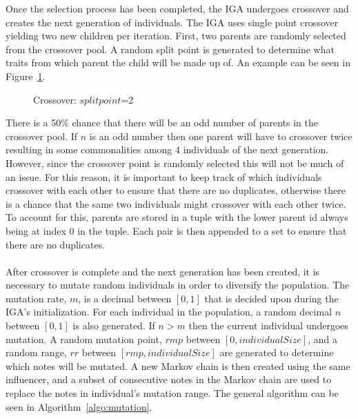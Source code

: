 \documentclass[12pt]{article} %
\begin{document}
Once the selection process has been completed, the IGA undergoes crossover and creates the next generation of individuals. The IGA uses single point crossover yielding two new children per iteration. First, two parents are randomly selected from the crossover pool. A random split point is generated to determine what traits from which parent the child will be made up of. An example can be seen in Figure~\ref{fig:crossover_ex}.

\begin{figure}[H]
\caption{Crossover: $split point$=2}
\label{fig:crossover_ex}
\end{figure}

There is a 50\% chance that there will be an odd number of parents in the crossover pool. If $n$ is an odd number then one parent will have to crossover twice resulting in some commonalities among 4 individuals of the next generation. However, since the crossover point is randomly selected this will not be much of an issue. For this reason, it is important to keep track of which individuals crossover with each other to ensure that there are no duplicates, otherwise there is a chance that the same two individuals might crossover with each other twice. To account for this, parents are stored in a tuple with the lower parent id always being at index 0 in the tuple. Each pair is then appended to a set to ensure that there are no duplicates. \\
\\
After crossover is complete and the next generation has been created, it is necessary to mutate random individuals in order to diversify the population. The mutation rate, $m$, is a decimal between $[0,1]$ that is decided upon during the IGA's initialization. For each individual in the population, a random decimal $n$ between $[0,1]$ is also generated. If $n > m$ then the current individual undergoes mutation. A random mutation point, $rmp$ between $[0, individualSize]$, and a random range, $rr$ between $[rmp,individualSize]$ are generated to determine which notes will be mutated. A new Markov chain is then created using the same influencer, and a subset of consecutive notes in the Markov chain are used to replace the notes in individual's mutation range. The general algorithm can be seen in Algorithm~\ref{algo:mutation}.
\end{document}
